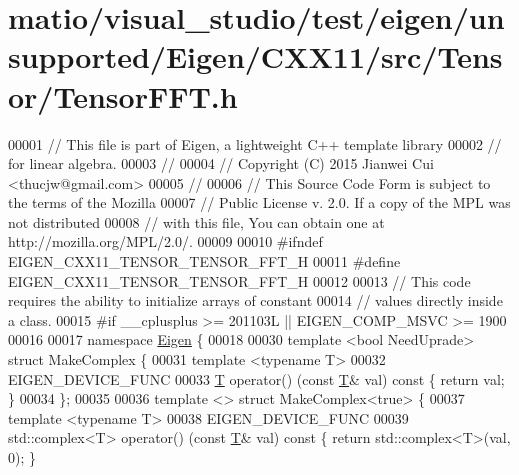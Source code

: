 \hypertarget{matio_2visual__studio_2test_2eigen_2unsupported_2_eigen_2_c_x_x11_2src_2_tensor_2_tensor_f_f_t_8h_source}{}\section{matio/visual\+\_\+studio/test/eigen/unsupported/\+Eigen/\+C\+X\+X11/src/\+Tensor/\+Tensor\+F\+FT.h}
\label{matio_2visual__studio_2test_2eigen_2unsupported_2_eigen_2_c_x_x11_2src_2_tensor_2_tensor_f_f_t_8h_source}

\begin{DoxyCode}
00001 \textcolor{comment}{// This file is part of Eigen, a lightweight C++ template library}
00002 \textcolor{comment}{// for linear algebra.}
00003 \textcolor{comment}{//}
00004 \textcolor{comment}{// Copyright (C) 2015 Jianwei Cui <thucjw@gmail.com>}
00005 \textcolor{comment}{//}
00006 \textcolor{comment}{// This Source Code Form is subject to the terms of the Mozilla}
00007 \textcolor{comment}{// Public License v. 2.0. If a copy of the MPL was not distributed}
00008 \textcolor{comment}{// with this file, You can obtain one at http://mozilla.org/MPL/2.0/.}
00009 
00010 \textcolor{preprocessor}{#ifndef EIGEN\_CXX11\_TENSOR\_TENSOR\_FFT\_H}
00011 \textcolor{preprocessor}{#define EIGEN\_CXX11\_TENSOR\_TENSOR\_FFT\_H}
00012 
00013 \textcolor{comment}{// This code requires the ability to initialize arrays of constant}
00014 \textcolor{comment}{// values directly inside a class.}
00015 \textcolor{preprocessor}{#if \_\_cplusplus >= 201103L || EIGEN\_COMP\_MSVC >= 1900}
00016 
00017 \textcolor{keyword}{namespace }\hyperlink{namespace_eigen}{Eigen} \{
00018 
00030 \textcolor{keyword}{template} <\textcolor{keywordtype}{bool} NeedUprade> \textcolor{keyword}{struct }MakeComplex \{
00031   \textcolor{keyword}{template} <\textcolor{keyword}{typename} T>
00032   EIGEN\_DEVICE\_FUNC
00033   \hyperlink{group___sparse_core___module_class_eigen_1_1_triplet}{T} operator() (\textcolor{keyword}{const} \hyperlink{group___sparse_core___module_class_eigen_1_1_triplet}{T}& val)\textcolor{keyword}{ const }\{ \textcolor{keywordflow}{return} val; \}
00034 \};
00035 
00036 \textcolor{keyword}{template} <> \textcolor{keyword}{struct }MakeComplex<true> \{
00037   \textcolor{keyword}{template} <\textcolor{keyword}{typename} T>
00038   EIGEN\_DEVICE\_FUNC
00039   std::complex<T> operator() (\textcolor{keyword}{const} \hyperlink{group___sparse_core___module_class_eigen_1_1_triplet}{T}& val)\textcolor{keyword}{ const }\{ \textcolor{keywordflow}{return} std::complex<T>(val, 0); \}

\end{DoxyCode}
